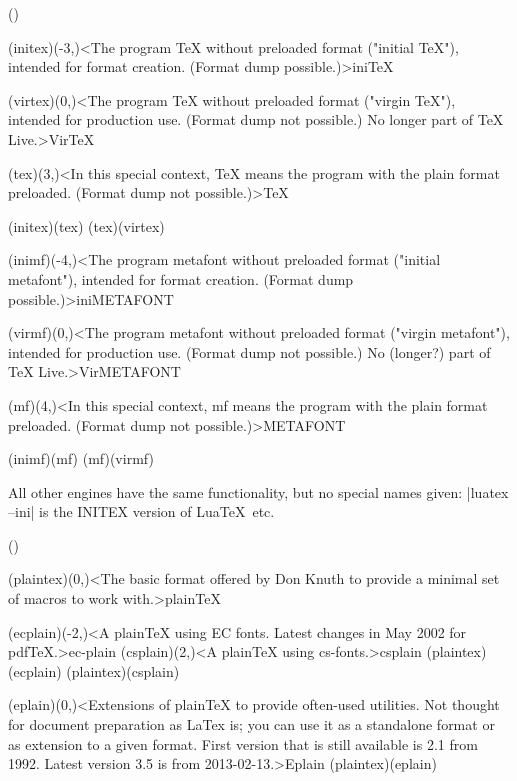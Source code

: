 \clearpage


\tograph(){
	\tonode(initex)(-3,\layer)<The program TeX without preloaded format ("initial TeX"), intended for format creation. (Format dump possible.)>{ini\TeX}

	\tonode(virtex)(0,\layer)<The program TeX without preloaded format ("virgin TeX"), intended for production use. (Format dump not possible.) No longer part of TeX Live.>{Vir\TeX}

	\tonode(tex)(3,\layer)<In this special context, TeX means the program with the plain format preloaded. (Format dump not possible.)>{\TeX}

	\todraw(initex)(tex)
	\todraw(tex)(virtex)

\steplayer[-2]

	\tonode(inimf)(-4,\layer)<The program metafont without preloaded format ("initial metafont"), intended for format creation. (Format dump possible.)>{iniMETAFONT}

	\tonode(virmf)(0,\layer)<The program metafont without preloaded format ("virgin metafont"), intended for production use. (Format dump not possible.) No (longer?) part of TeX Live.>{VirMETAFONT}

	\tonode(mf)(4,\layer)<In this special context, mf means the program with the plain format preloaded. (Format dump not possible.)>{METAFONT}

	\todraw(inimf)(mf)
	\todraw(mf)(virmf)

}

{\flushleft All other engines have the same functionality, but no special names given: |luatex --ini| is the INITEX version of Lua\TeX\ etc.

}

\tograph(){
	\tonode(plaintex)(0,\layer)<The basic format offered by Don Knuth to provide a minimal set of macros to work with.>{plain\TeX}
\steplayer[-2]

	\tonode[\experimental](ecplain)(-2,\layer)<A plainTeX using EC fonts. Latest changes in May 2002 for pdfTeX.>{ec-plain}
	\tonode[\experimental](csplain)(2,\layer)<A plainTeX using cs-fonts.>{csplain}
	\todraw(plaintex)(ecplain)
	\todraw(plaintex)(csplain)

\steplayer[-2]
	\tonode[\experimental](eplain)(0,\layer)<Extensions of plainTeX to provide often-used utilities. Not thought for document preparation as LaTex is; you can use it as a standalone format or as extension to a given format. First version that is still available is 2.1 from 1992. Latest version 3.5 is from 2013-02-13.>{Eplain}
	\todraw(plaintex)(eplain)
}
\clearpage

